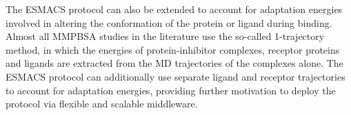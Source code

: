 The ESMACS protocol can also be extended to account for adaptation energies
involved in altering the conformation of the protein or ligand during
binding. Almost all MMPBSA studies in the literature use the so-called
1-trajectory method, in which the energies of protein-inhibitor complexes,
receptor proteins and ligands are extracted from the MD trajectories of the
complexes alone. The ESMACS protocol can additionally use separate ligand and
receptor trajectories to account for adaptation energies, providing further
motivation to deploy the protocol via flexible and scalable middleware.